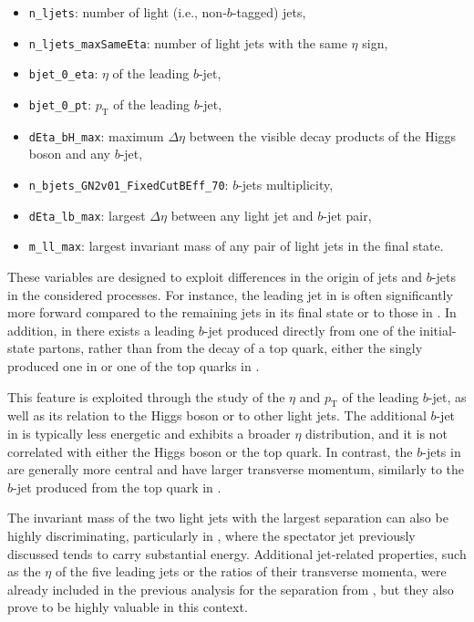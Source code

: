\begin{itemize}
  \small
  \item \texttt{n\_ljets}: number of light (i.e., non-$b$-tagged) jets,
  \item \texttt{n\_ljets\_maxSameEta}: number of light jets with the same $\eta$ sign,
  \item \texttt{bjet\_0\_eta}: $\eta$ of the leading $b$-jet,
  \item \texttt{bjet\_0\_pt}: $p_{\mathrm{T}}$ of the leading $b$-jet,
  \item \texttt{dEta\_bH\_max}: maximum $\Delta \eta$ between the visible decay products of the Higgs boson and any $b$-jet,
  \item \texttt{n\_bjets\_GN2v01\_FixedCutBEff\_70}: $b$-jets multiplicity,
  \item \texttt{dEta\_lb\_max}: largest $\Delta \eta$ between any light jet and $b$-jet pair,
  \item \texttt{m\_ll\_max}: largest invariant mass of any pair of light jets in the final state.
\end{itemize}

These variables are designed to exploit differences in the origin of jets and $b$-jets in the considered processes.
For instance, the leading jet in \thqb is often significantly more forward compared to the remaining jets in its final state or to those in \ttH. In addition, in \thqb there exists a leading $b$-jet produced directly from one of the initial-state partons, rather than from the decay of a top quark, either the singly produced one in \thqb or one of the top quarks in \ttH.

This feature is exploited through the study of the $\eta$ and $p_{\mathrm{T}}$ of the leading $b$-jet, as well as its relation to the Higgs boson or to other light jets. The additional $b$-jet in \thqb is typically less energetic and exhibits a broader $\eta$ distribution, and it is not correlated with either the Higgs boson or the top quark. In contrast, the $b$-jets in \ttH are generally more central and have larger transverse momentum, similarly to the $b$-jet produced from the top quark in \thqb.

The invariant mass of the two light jets with the largest separation can also be highly discriminating, particularly in \thqb, where the spectator jet previously discussed tends to carry substantial energy. Additional jet-related properties, such as the $\eta$ of the five leading jets or the ratios of their transverse momenta, were already included in the previous analysis for the separation from \ztautau, but they also prove to be highly valuable in this context.

